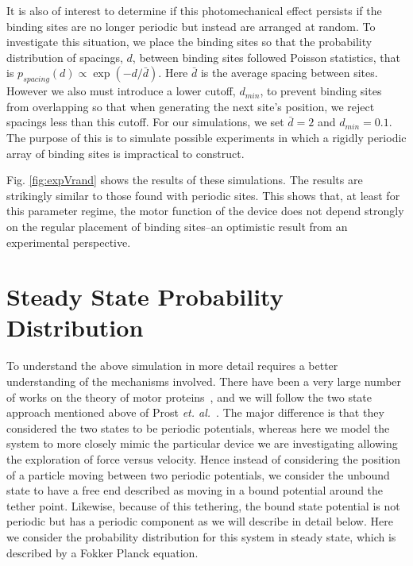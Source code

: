 \documentclass[journal = mamobx, manuscript = article]{achemso}
\begin{document}
It is also of interest to determine if this photomechanical effect persists if the binding sites are no longer periodic but instead are arranged at random. To investigate this situation, we place the binding sites so that the probability distribution of spacings, $d$, between binding sites followed Poisson statistics, that is $p_{spacing}(d) \propto \exp(-d/{\bar d})$. Here ${\bar d}$ is the average spacing between sites. However we also must introduce a lower cutoff, $d_{min}$, to prevent binding sites from overlapping so that when generating the next site's position, we reject spacings less than this cutoff. For our simulations, we set $\bar d = 2$ and $d_{min} = 0.1$. The purpose of this is to simulate possible experiments in which a rigidly periodic array of binding sites is impractical to construct.

Fig. \ref{fig:expVrand} shows the results of these simulations. The results are strikingly similar to those found with periodic sites. This shows that, at least for this parameter regime, the motor function of the device does not depend strongly on the regular placement of binding sites--an optimistic result from an experimental perspective.


\section{Steady State Probability Distribution}
\label{sec:SSPD}
To understand the above simulation in more detail requires a
better understanding of the mechanisms involved. There have been a very large
number of works on the theory of motor proteins~\cite{ReimannRev,BustamanteKellerOster}, and we will follow the two
state approach mentioned above of Prost {\em et. al.}~\cite{ProstPRL,JulicherRevModPhys}. 
The major difference is that they considered the two states to be periodic
potentials, whereas here we model the system to more closely mimic the
particular device we are investigating allowing the exploration
of force versus velocity. Hence instead of considering the
position of a particle moving between two periodic potentials, we consider
the unbound state to have a free end described as moving in a bound
potential around the tether point. Likewise, because of this tethering, the
bound state potential is not periodic but has a periodic component as we
will describe in detail below.
Here we consider the probability distribution for this system in steady
state, which is described by a Fokker Planck equation.
\end{document}
